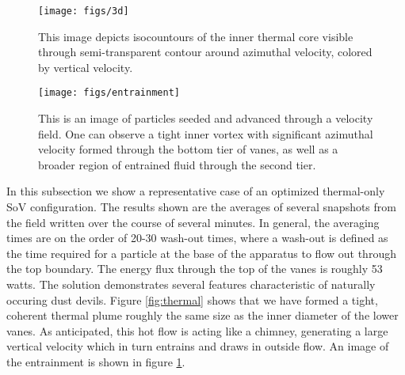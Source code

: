   \begin{figure}[htp]
   
   \centering
   \begin{minipage}{0.47\textwidth}
    \texttt{[image: figs/3d]}
    \caption{This image depicts isocountours of the inner thermal core
    visible through semi-transparent contour around azimuthal velocity,
    colored by vertical velocity. }
   \end{minipage}      
   \label{fig:thermal}  

   \centering   
   \begin{minipage}{0.47\textwidth}
    \texttt{[image: figs/entrainment]}%
    \caption{This is an image of particles seeded and advanced
    through a velocity field. One can observe a tight inner vortex with
    significant azimuthal velocity formed through the bottom tier of
    vanes, as well as a broader region of entrained fluid through the
    second tier.} 
   \end{minipage}   
   \label{fig:entrain}  
  \end{figure}   



In this subsection we show a representative case of an optimized thermal-only SoV
configuration. The results shown are the averages of several snapshots
from the field written over the course of several minutes. In general,
the averaging times are on the order of 20-30 wash-out times, where a
wash-out is defined as the time required for a particle at the base of
the apparatus to flow out through the top boundary. The energy flux
through the top of the vanes is roughly 53 watts. The solution
demonstrates several features characteristic of naturally occuring dust
devils. Figure \ref{fig:thermal} shows that we have formed a tight,
coherent thermal plume roughly the same size as the inner diameter of the
lower vanes. As anticipated, this hot flow is acting like a chimney,
generating a large vertical velocity which in turn entrains and draws in
outside flow. An image of the entrainment is shown in figure
\ref{fig:entrain}. 


